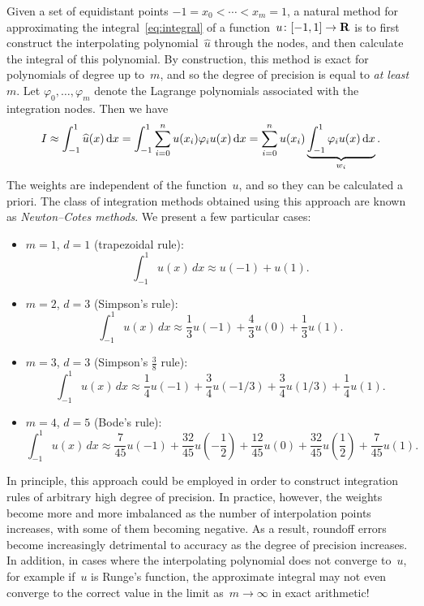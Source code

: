 Given a set of equidistant points $-1 = x_0 < \dotsb < x_m = 1$,
a natural method for approximating the integral~\eqref{eq:integral} of a function~$u\colon [-1, 1] \to \mathbf R$
is to first construct the interpolating polynomial~$\widehat u$ through the nodes,
and then calculate the integral of this polynomial.
By construction, this method is exact for polynomials of degree up to~$m$,
and so the degree of precision is equal to \emph{at least}~$m$.
Let $\varphi_0, \dotsc, \varphi_m$ denote the Lagrange polynomials associated with the integration nodes.
Then we have
\[
    I \approx \int_{-1}^{1} \widehat u(x) \, \mathrm d x
    = \int_{-1}^{1} \sum_{i=0}^{n} u(x_i) \varphi_i u(x) \, \mathrm d x
    = \sum_{i=0}^{n} u(x_i) \underbrace{\int_{-1}^{1}  \varphi_i u(x)  \, \mathrm d x}_{w_i}.
\]
The weights are independent of the function~$u$,
and so they can be calculated a priori.
The class of integration methods obtained using this approach are known as \emph{Newton--Cotes methods}.
We present a few particular cases:
\begin{itemize}
    \item
        $m = 1$, $d = 1$ (trapezoidal rule):
        \begin{equation}
            \label{eq:trapezoidal_rule}
            \int_{-1}^{1} u(x) \, dx
            \approx u(-1) + u(1).
        \end{equation}

    \item
        $m = 2$, $d = 3$ (Simpson's rule):
        \begin{equation}
            \label{eq:simpsons}
            \int_{-1}^{1} u(x) \, dx
            \approx \frac{1}{3} u(-1) + \frac{4}{3} u(0) + \frac{1}{3} u(1).
        \end{equation}

    \item
        $m = 3$, $d = 3$ (Simpson's $\frac{3}{8}$ rule):
        \[
            \int_{-1}^{1} u(x) \, dx
            \approx \frac{1}{4} u(-1) + \frac{3}{4} u(-1/3) + \frac{3}{4} u(1/3) + \frac{1}{4} u(1).
        \]

    \item
        $m = 4$, $d = 5$ (Bode's rule):
        \[
            \int_{-1}^{1} u(x) \, dx
            \approx \frac{7}{45} u(-1) + \frac{32}{45} u\left(-\frac{1}{2}\right) + \frac{12}{45} u\left(0\right) + \frac{32}{45} u\left(\frac{1}{2}\right) + \frac{7}{45} u(1).
        \]
\end{itemize}
In principle,
this approach could be employed in order to construct integration rules of arbitrary high degree of precision.
In practice, however, the weights become more and more imbalanced as the number of interpolation points increases,
with some of them becoming negative.
As a result, roundoff errors become increasingly detrimental to accuracy as the degree of precision increases.
In addition, in cases where the interpolating polynomial does not converge to~$u$,
for example if~$u$ is Runge's function,
the approximate integral may not even converge to the correct value in the limit as~$m \to \infty$ in exact arithmetic!

